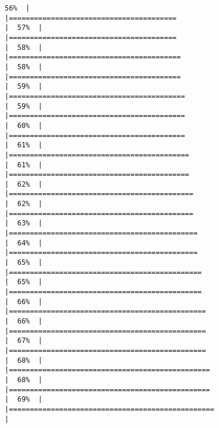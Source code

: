 \documentclass[
]{book}
\begin{document}
\begin{verbatim}
56%  |                                                                              |========================================                              |  57%  |                                                                              |========================================                              |  58%  |                                                                              |=========================================                             |  58%  |                                                                              |=========================================                             |  59%  |                                                                              |==========================================                            |  59%  |                                                                              |==========================================                            |  60%  |                                                                              |==========================================                            |  61%  |                                                                              |===========================================                           |  61%  |                                                                              |===========================================                           |  62%  |                                                                              |============================================                          |  62%  |                                                                              |============================================                          |  63%  |                                                                              |=============================================                         |  64%  |                                                                              |=============================================                         |  65%  |                                                                              |==============================================                        |  65%  |                                                                              |==============================================                        |  66%  |                                                                              |===============================================                       |  66%  |                                                                              |===============================================                       |  67%  |                                                                              |===============================================                       |  68%  |                                                                              |================================================                      |  68%  |                                                                              |================================================                      |  69%  |                                                                              |=================================================                     |  
\end{verbatim}
\end{document}
